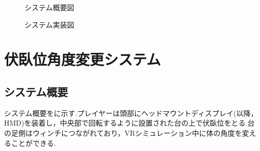 \documentclass[uplatex]{jsarticle}
\begin{document}
 \begin{figure}[tb]
  \centering
  \caption{システム概要図}
  \label{fig:about_system}

  \centering
  \caption{システム実装図}
  \label{fig:build_system}

\end{figure}

\section{伏臥位角度変更システム}
\subsection{システム概要}
システム概要をに示す.プレイヤーは頭部にヘッドマウントディスプレイ(以降，HMD)を装着し，中央部で回転するように設置された台の上で伏臥位をとる.台の足側はウィンチにつながれており，VRシミュレーション中に体の角度を変えることができる.
\end{document}
